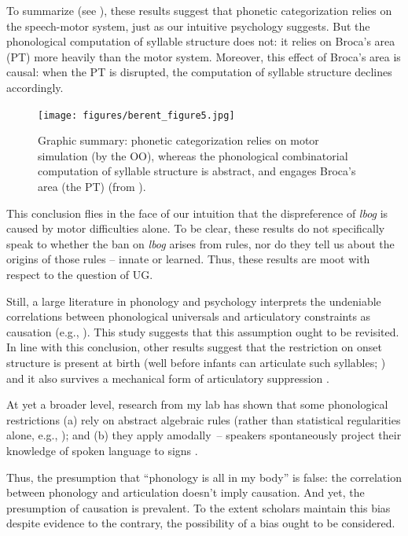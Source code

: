 \documentclass[output=paper,colorlinks,citecolor=brown
]{langscibook}
\begin{document}
To summarize (see ), these results suggest that phonetic categorization relies on the speech-motor system, just as our intuitive psychology suggests. But the phonological computation of syllable structure does not: it relies on Broca’s area (PT) more heavily than the motor system. Moreover, this effect of Broca’s area is causal: when the PT is disrupted, the computation of syllable structure declines accordingly.

\begin{figure}
    \centering
    \texttt{[image: figures/berent\_figure5.jpg]}
    \caption{Graphic summary: phonetic categorization relies on motor simulation (by the OO), whereas the phonological combinatorial computation of syllable structure is abstract, and engages Broca’s area (the PT) (from \cite{berent2023phonetic}). }
    \label{fig:figure5}
\end{figure}

This conclusion flies in the face of our intuition that the dispreference of \textit{lbog} is caused by motor difficulties alone. To be clear, these results do not specifically speak to whether the ban on \textit{lbog} arises from rules, nor do they tell us about the origins of those rules -- innate or learned. Thus, these results are moot with respect to the question of UG. 

Still, a large literature in phonology and psychology interprets the undeniable correlations between phonological universals and articulatory constraints as causation (e.g., \cite{hayes2004phonetically}). This study suggests that this assumption ought to be revisited. In line with this conclusion, other results suggest that the restriction on onset structure is present at birth (well before infants can articulate such syllables; \cite{gomez2014language}) and it also survives a mechanical form of articulatory suppression \citep{berent2022phonology}. 

At yet a broader level, research from my lab has shown that some phonological restrictions (a) rely on abstract algebraic rules (rather than statistical regularities alone, e.g., \cite{berent2002scope,gervain2012binding}); and (b) they apply amodally~-- speakers spontaneously project their knowledge of spoken language to signs \citep{berent2021amodal,berent2016double,berent2020knowledge,berent2021infants,berent2023phonetic}. 

Thus, the presumption that “phonology is all in my body” is false: the correlation between phonology and articulation doesn’t imply causation. And yet, the presumption of causation is prevalent. To the extent scholars maintain this bias despite evidence to the contrary, the possibility of a bias ought to be considered. 
\end{document}
